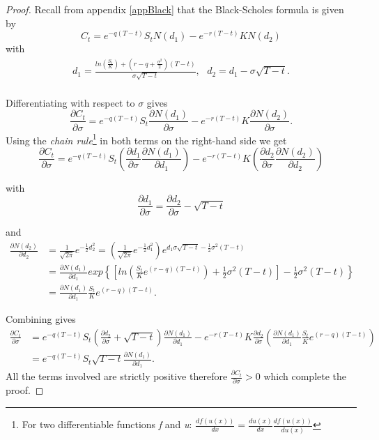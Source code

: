 \documentclass{article}
\theoremstyle{definition}
\theoremstyle{remark}
\begin{document}
\begin{proof}
Recall from appendix \ref{appBlack} that the Black-Scholes formula is given by
\begin{equation*}
C_t=e^{-q(T-t)}S_tN(d_1)-e^{-r(T-t)}KN(d_2)
\end{equation*}
with
\begin{align*}
d_1=\frac{ln\left( \frac{S_t}{K}\right)+\left( r-q+\frac{\sigma^2}{2}\right)(T-t)}{\sigma\sqrt{T-t}}, \text{ } d_2=d_1-\sigma\sqrt{T-t}.\\
\end{align*}

Differentiating with respect to $\sigma$ gives
\begin{equation*}
\frac{\partial C_t}{\partial \sigma}=e^{-q(T-t)}S_t\frac{\partial N(d_1)}{\partial \sigma}-e^{-r(T-t)}K\frac{\partial N(d_2)}{\partial \sigma}.
\end{equation*}
Using the \textit{chain rule}\footnote{For two differentiable functions \textit{f} and \textit{u}: $\frac{df(u(x))}{dx}=\frac{du(x)}{dx}\frac{df(u(x))}{du(x)}$} in both terms on the right-hand side we get
\begin{equation*}
\frac{\partial C_t}{\partial \sigma}=e^{-q(T-t)}S_t\left( \frac{\partial d_1}{\partial \sigma}\frac{\partial N(d_1)}{\partial d_1} \right)-e^{-r(T-t)}K\left( \frac{\partial d_2}{\partial \sigma}\frac{\partial N(d_2)}{\partial d_2} \right)
\end{equation*}

with
\begin{equation*}
\frac{\partial d_1}{\partial \sigma}=\frac{\partial d_2}{\partial \sigma}-\sqrt{T-t}
\end{equation*}

and
\begin{align*}
\frac{\partial N(d_2)}{\partial d_2}&= \frac{1}{\sqrt{2\pi}}e^{-\frac{1}{2}d_2^2}=\left( \frac{1}{\sqrt{2\pi}}e^{-\frac{1}{2}d_1^2} \right) e^{d_1\sigma\sqrt{T-t}-\frac{1}{2}\sigma^2(T-t)}\\
&=\frac{\partial N(d_1)}{\partial d_1}exp\left\{\left[ ln\left(\frac{S_t}{K}e^{(r-q)(T-t)}\right)+\frac{1}{2}\sigma^2(T-t)\right]-\frac{1}{2}\sigma^2(T-t)\right\}\\
&=\frac{\partial N(d_1)}{\partial d_1}\frac{S_t}{K}e^{(r-q)(T-t)}.
\end{align*}

Combining gives
\begin{align*}
\frac{\partial C_t}{\partial \sigma}&=e^{-q(T-t)}S_t\left(\frac{\partial d_2}{\partial \sigma}+\sqrt{T-t} \right)\frac{\partial N(d_1)}{\partial d_1} -e^{-r(T-t)}K \frac{\partial d_2}{\partial \sigma}\left( \frac{\partial N(d_1)}{\partial d_1}\frac{S_t}{K}e^{(r-q)(T-t)} \right)\\
&=e^{-q(T-t)}S_t\sqrt{T-t} \frac{\partial N(d_1)}{\partial d_1}.
\end{align*}
All the terms involved are strictly positive therefore $\frac{\partial C_t}{\partial \sigma}>0$ which complete the proof.
\end{proof}
\end{document}
